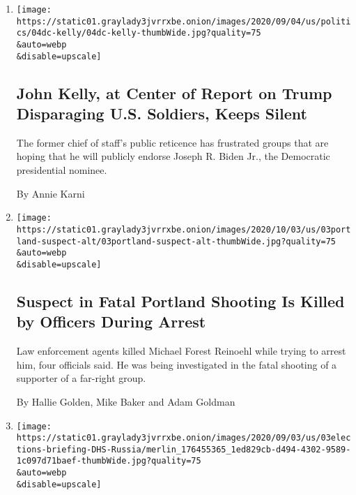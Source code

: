 \begin{enumerate}
\def\labelenumi{\arabic{enumi}.}
\item
  \href{/2020/09/04/us/politics/kelly-trump.html}{}

  \texttt{[image: https://static01.graylady3jvrrxbe.onion/images/2020/09/04/us/politics/04dc-kelly/04dc-kelly-thumbWide.jpg?quality=75\\\&auto=webp\\\&disable=upscale]}

  \hypertarget{john-kelly-at-center-of-report-on-trump-disparaging-us-soldiers-keeps-silent}{%
  \subsection{John Kelly, at Center of Report on Trump Disparaging U.S.
  Soldiers, Keeps
  Silent}\label{john-kelly-at-center-of-report-on-trump-disparaging-us-soldiers-keeps-silent}}

  The former chief of staff's public reticence has frustrated groups
  that are hoping that he will publicly endorse Joseph R. Biden Jr., the
  Democratic presidential nominee.

  By Annie Karni
\item
  \href{/2020/09/03/us/michael-reinoehl-arrest-portland-shooting.html}{}

  \texttt{[image: https://static01.graylady3jvrrxbe.onion/images/2020/10/03/us/03portland-suspect-alt/03portland-suspect-alt-thumbWide.jpg?quality=75\\\&auto=webp\\\&disable=upscale]}

  \hypertarget{suspect-in-fatal-portland-shooting-is-killed-by-officers-during-arrest}{%
  \subsection{Suspect in Fatal Portland Shooting Is Killed by Officers
  During
  Arrest}\label{suspect-in-fatal-portland-shooting-is-killed-by-officers-during-arrest}}

  Law enforcement agents killed Michael Forest Reinoehl while trying to
  arrest him, four officials said. He was being investigated in the
  fatal shooting of a supporter of a far-right group.

  By Hallie Golden, Mike Baker and Adam Goldman
\item
  \href{/live/2020/09/03/us/trump-vs-biden/russian-backed-meddlers-spread-disinformation-about-mail-in-ballots-homeland-security-says}{}

  \texttt{[image: https://static01.graylady3jvrrxbe.onion/images/2020/09/03/us/03elections-briefing-DHS-Russia/merlin\_176455365\_1ed829cb-d494-4302-9589-1c097d71baef-thumbWide.jpg?quality=75\\\&auto=webp\\\&disable=upscale]}


\end{enumerate}
